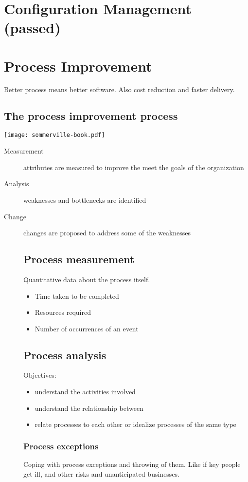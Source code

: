 \documentclass[a4paper,11pt,twocolumn]{report}
\begin{document}
\begin{description}
    \chapter{Configuration Management (passed)}

    \chapter{Process Improvement}
    Better process means better software. Also cost reduction and faster
    delivery.
    \section{The process improvement process}
    \texttt{[image: sommerville-book.pdf]}
    \begin{description}
        \item[Measurement] attributes are measured to improve the meet the
            goals of the organization
        \item[Analysis] weaknesses and bottlenecks are identified
        \item[Change] changes are proposed to address some of the weaknesses
    \section{Process measurement}
    Quantitative data about the process itself.
    \begin{itemize}
        \item Time taken to be completed
        \item Resources required
        \item Number of occurrences of an event
    \end{itemize}
    \section{Process analysis}
    Objectives:
    \begin{itemize}
        \item understand the activities involved
        \item understand the relationship between
        \item relate processes to each other or idealize processes of the same
            type
    \end{itemize}
    \subsection{Process exceptions}
    Coping with process exceptions and throwing of them. Like if key people get
    ill, and other risks and unanticipated businesses.

\end{description}
\end{description}
\end{document}
